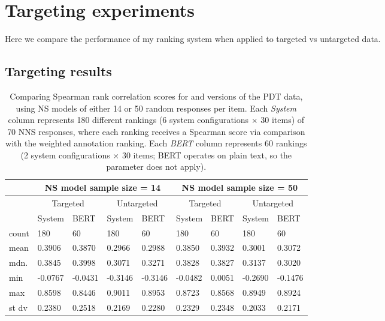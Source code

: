 \section{Targeting experiments}
\label{sec:exp-targeting}
Here we compare the performance of my ranking system when applied to targeted vs untargeted data.
\subsection{Targeting results}
\label{sec:targeting-results}

\begin{table}[htb!]
\begin{center}
\begin{tabular}{|l||l|l||l|l||l|l||l|l|}
\hline
& \multicolumn{4}{c||}{NS model sample size = 14} & \multicolumn{4}{c|}{NS model sample size = 50} \\
\hline
 & \multicolumn{2}{c||}{Targeted} & \multicolumn{2}{c||}{Untargeted} & \multicolumn{2}{c||}{Targeted} & \multicolumn{2}{c|}{Untargeted} \\
\hline
	& System 		& BERT 		& System 	& BERT 		& System 	& BERT 		& System 	& BERT \\
\hline
count 	& 180 		& 60 		& 180 		& 60 		& 180 		& 60 		& 180 		& 60 \\
\hline
mean 	& 0.3906 	& 0.3870 	& 0.2966 	& 0.2988 	& 0.3850 	& 0.3932 	& 0.3001 	& 0.3072  \\
\hline
mdn. 	& 0.3845 	& 0.3998 	& 0.3071 	& 0.3271 	& 0.3828 	& 0.3827 	& 0.3137 	& 0.3020 \\
\hline
min 	& -0.0767 	& -0.0431 	& -0.3146 	& -0.3146 	& -0.0482 	& 0.0051	& -0.2690 	& -0.1476 \\
\hline
max 	& 0.8598 	& 0.8446 	& 0.9011	& 0.8953 	& 0.8723 	& 0.8568	& 0.8949 	& 0.8924 \\
\hline
st dv & 0.2380 	& 0.2518 	& 0.2169 	& 0.2280 	& 0.2329 	& 0.2348	& 0.2033 	& 0.2171 \\
\hline
\end{tabular}
\caption{\label{tab:targeting-results} Comparing Spearman rank correlation scores for  and  versions of the PDT data, using NS models of either 14 or 50 random responses per item. Each \textit{System} column represents 180 different rankings (6 system configurations $\times$ 30 items) of 70 NNS responses, where each ranking receives a Spearman score via comparison with the weighted annotation ranking. Each \textit{BERT} column represents 60 rankings (2 system configurations $\times$ 30 items; BERT operates on plain text, so the  parameter does not apply).}
\end{center}
\end{table}


